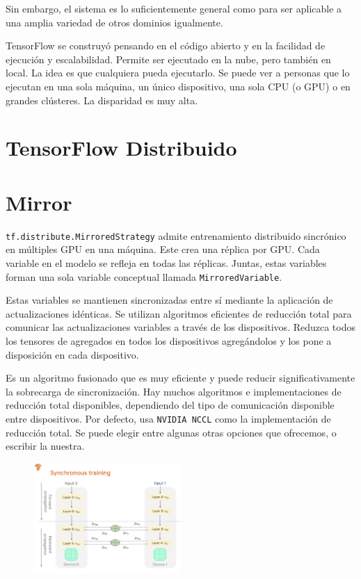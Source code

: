 \documentclass[10pt, fleqn, journal]{IEEEtran}
\theoremstyle{break}                                            %
\begin{document}
    Sin embargo, el sistema es lo suficientemente general como para ser aplicable a una amplia variedad 
    de otros dominios igualmente.

    TensorFlow se construyó pensando en el código abierto y en la facilidad de ejecución y escalabilidad. 
    Permite ser ejecutado en la nube, pero también en local. La idea es que cualquiera pueda ejecutarlo. 
    Se puede ver a personas que lo ejecutan en una sola máquina, un único dispositivo, una sola CPU (o GPU) 
    o en grandes clústeres. La disparidad es muy alta.

  \section{TensorFlow Distribuido}
  

  \section{Mirror}

    \texttt{tf.distribute.MirroredStrategy}
    admite entrenamiento distribuido sincrónico en múltiples GPU en una máquina. 
    Este crea una réplica por GPU. Cada variable en el modelo se refleja en todas las réplicas. 
    Juntas, estas variables forman una sola variable conceptual llamada \texttt{MirroredVariable}. 
    
    Estas variables se mantienen sincronizadas entre sí mediante la aplicación de actualizaciones idénticas.
    Se utilizan algoritmos eficientes de reducción total para comunicar las actualizaciones variables a través 
    de los dispositivos. Reduzca todos los tensores de agregados en todos los dispositivos agregándolos 
    y los pone a disposición en cada dispositivo. 
    
    Es un algoritmo fusionado que es muy eficiente y puede reducir significativamente la sobrecarga de sincronización. 
    Hay muchos algoritmos e implementaciones de reducción total disponibles, dependiendo del tipo de 
    comunicación disponible entre dispositivos. Por defecto, usa \texttt{NVIDIA NCCL} como la implementación 
    de reducción total. Se puede elegir entre algunas otras opciones que ofrecemos, o escribir la nuestra.

    \begin{figure}[ht!]
      \centering
      \includegraphics[width=0.5\textwidth]{syn}
  \end{figure}
\end{document}
